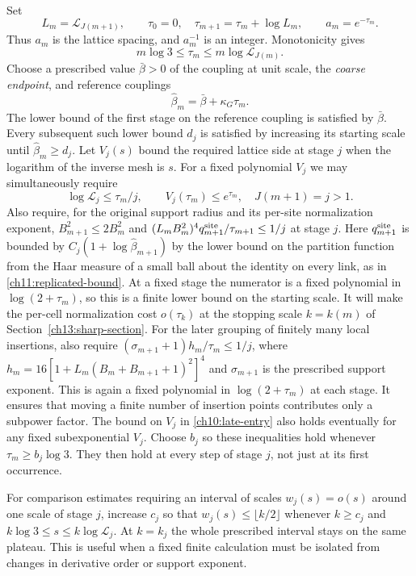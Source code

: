Set
\begin{equation}\label{ch10:scales}
 L_m=\mathscr L_{J(m+1)},\qquad
 \tau_0=0,\quad \tau_{m+1}=\tau_m+\log L_m,
 \qquad a_m=e^{-\tau_m}.
\end{equation}
Thus $a_m$ is the lattice spacing, and $a_m^{-1}$ is an integer.
Monotonicity gives
\[
 m\log3\le\tau_m\le m\log\mathscr L_{J(m)}.
\]
Choose a prescribed value $\bar\beta>0$ of the coupling at unit scale, the \emph{coarse endpoint}, and reference couplings
\begin{equation}\label{ch10:reference}
             \widehat\beta_m=\bar\beta+\kappa_G\tau_m.
\end{equation}
The lower bound of the first stage on the reference coupling is satisfied by $\bar\beta$. Every subsequent
such lower bound $d_j$ is satisfied by increasing its starting scale until
$\widehat\beta_m\ge d_j$. Let $V_j(s)$ bound the required lattice side at stage $j$ when the
logarithm of the inverse mesh is $s$. For a fixed polynomial $V_j$ we may
simultaneously require
\begin{equation}\label{ch10:late-entry}
 \log\mathscr L_j\le\tau_m/j,\qquad
 V_j(\tau_m)\le e^{\tau_m},
 \quad J(m+1)=j>1.
\end{equation}
Also require, for the original support radius and its per-site
normalization exponent, $B_{m+1}^2\le2B_m^2$ and
$(L_m B_m^2)^4q_{m+1}^{\rm site}/\tau_{m+1}\le1/j$ at stage $j$.
Here $q_{m+1}^{\rm site}$ is bounded by
$C_j(1+\log\widehat\beta_{m+1})$ by the lower bound on the partition function from the Haar measure of a small ball
about the identity on every link, as in \eqref{ch11:replicated-bound}. At a fixed stage the numerator is a fixed polynomial in
$\log(2+\tau_m)$, so this is a finite lower bound on the starting scale. It will make
the per-cell normalization cost $o(\tau_k)$ at the stopping scale $k=k(m)$ of Section~\ref{ch13:sharp-section}. For the
later grouping of finitely many local insertions, also require
$(\sigma_{m+1}+1)h_m/\tau_m\le1/j$, where
$h_m=16[1+L_m(B_m+B_{m+1}+1)^2]^4$ and $\sigma_{m+1}$ is the
prescribed support exponent. This is again a fixed polynomial in
$\log(2+\tau_m)$ at each stage. It ensures that moving a finite
number of insertion points contributes only a subpower factor.
The bound on $V_j$ in \eqref{ch10:late-entry} also holds eventually
for any fixed subexponential $V_j$.
Choose $b_j$ so these inequalities hold whenever
$\tau_m\ge b_j\log3$. They then hold at every step of stage $j$,
not just at its first occurrence.

For comparison estimates requiring an interval of scales $w_j(s)=o(s)$ around
one scale of stage $j$, increase $c_j$ so that
$w_j(s)\le\lfloor k/2\rfloor$ whenever
$k\ge c_j$ and $k\log3\le s\le k\log\mathscr L_j$.
At $k=k_j$ the whole prescribed interval stays on the same plateau.
This is useful when a fixed finite calculation must be isolated from
changes in derivative order or support exponent.

